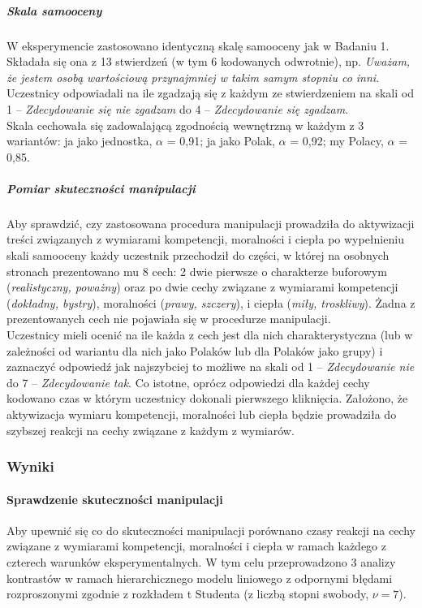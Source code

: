 \documentclass[man]{apa6}
\begin{document}
\subparagraph{Skala samooceny}
W eksperymencie zastosowano identyczną skalę samooceny jak w Badaniu 1. Składała się ona z 13 stwierdzeń (w tym 6 kodowanych odwrotnie), np. \emph{Uważam, że jestem osobą wartościową przynajmniej w takim samym stopniu co inni}. Uczestnicy odpowiadali na ile zgadzają się z każdym ze stwierdzeniem na skali od 1 -- \emph{Zdecydowanie się nie zgadzam} do 4 -- \emph{Zdecydowanie się zgadzam}. \\
Skala cechowała się zadowalającą zgodnością wewnętrzną w każdym z 3 wariantów: ja jako jednostka, $\alpha$ = 0,91; ja jako Polak, $\alpha$ = 0,92; my Polacy, $\alpha$ = 0,85.
\subparagraph{Pomiar skuteczności manipulacji}
Aby sprawdzić, czy zastosowana procedura manipulacji prowadziła do aktywizacji treści związanych z wymiarami kompetencji, moralności i ciepła po wypełnieniu skali samooceny każdy uczestnik przechodził do części, w której na osobnych stronach prezentowano mu 8 cech: 2 dwie pierwsze o charakterze buforowym (\emph{realistyczny, poważny}) oraz po dwie cechy związane z wymiarami kompetencji (\emph{dokładny, bystry}), moralności (\emph{prawy, szczery}), i ciepła (\emph{miły, troskliwy}). Żadna z prezentowanych cech nie pojawiała się w procedurze manipulacji. \\
Uczestnicy mieli ocenić na ile każda z cech jest dla nich charakterystyczna (lub w zależności od wariantu dla nich jako Polaków lub dla Polaków jako grupy) i zaznaczyć odpowiedź jak najszybciej to możliwe na skali od 1 -- \emph{Zdecydowanie nie} do 7 -- \emph{Zdecydowanie tak}. Co istotne, oprócz odpowiedzi dla każdej cechy kodowano czas w którym uczestnicy dokonali pierwszego kliknięcia. Założono, że aktywizacja wymiaru kompetencji, moralności lub ciepła będzie prowadziła do szybszej reakcji na cechy związane z każdym z wymiarów.

\subsubsection{Wyniki}
\paragraph{Sprawdzenie skuteczności manipulacji}
Aby upewnić się co do skuteczności manipulacji porównano czasy reakcji na cechy związane z wymiarami kompetencji, moralności i ciepła w ramach każdego z czterech warunków eksperymentalnych. W tym celu przeprowadzono 3 analizy kontrastów w ramach hierarchicznego modelu liniowego \parencite[odpowiednika  klasycznej jednoczynnikowej analizy wariancji, za:,][]{kruschke2014doing} z odpornymi błędami rozproszonymi zgodnie z rozkładem t Studenta (z liczbą stopni swobody, $\nu = 7$).\\
\end{document}
